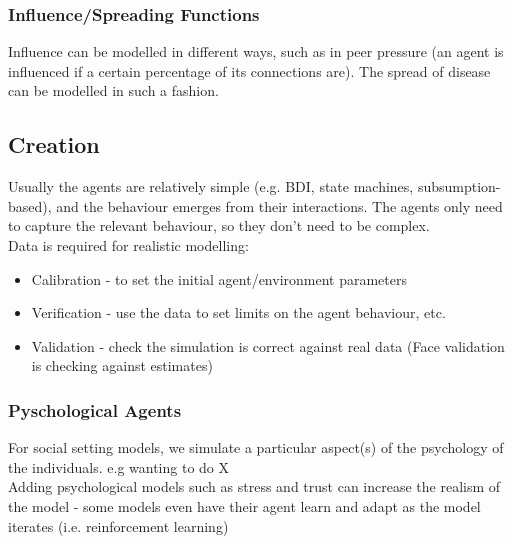 \subsubsection{Influence/Spreading Functions}
Influence can be modelled in different ways, such as in peer pressure (an agent is influenced if a certain percentage of its connections are). The spread of disease can be modelled in such a fashion. 

\subsection{Creation}
Usually the agents are relatively simple (e.g. BDI, state machines, subsumption-based), and the behaviour emerges from their interactions. The agents only need to capture the relevant behaviour, so they don't need to be complex. \\

Data is required for realistic modelling:

\begin{itemize}
    \item Calibration - to set the initial agent/environment parameters
    \item Verification - use the data to set limits on the agent behaviour, etc.
    \item Validation - check the simulation is correct against real data (Face validation is checking against estimates)
\end{itemize}

\subsubsection{Pyschological Agents}
For social setting models, we simulate a particular aspect(s) of the psychology of the individuals. e.g wanting to do X\\

Adding psychological models such as stress and trust can increase the realism of the model - some models even have their agent learn and adapt as the model iterates (i.e. reinforcement learning)

